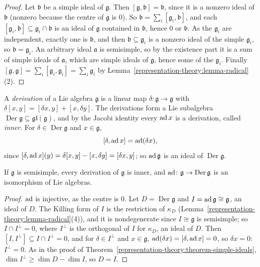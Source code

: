 \begin{proof}
Let $\mathfrak{b}$ be a simple ideal of $\mathfrak{g}$. Then $[\mathfrak{g}, \mathfrak{b}] = \mathfrak{b}$, since it is a nonzero ideal of $\mathfrak{b}$ (nonzero because the
centre of $\mathfrak{g}$ is $0$). So $\mathfrak{b} = \sum_i[\mathfrak{g}_i, \mathfrak{b}]$, and each $[\mathfrak{g}_i, \mathfrak{b}] \subseteq \mathfrak{g}_i \cap \mathfrak{b}$ is
an ideal of $\mathfrak{g}$ contained in $\mathfrak{b}$, hence $0$ or $\mathfrak{b}$. As the $\mathfrak{g}_i$ are independent, exactly one is $\mathfrak{b}$, and then
$\mathfrak{b} \subseteq \mathfrak{g}_i$ is a nonzero ideal of the simple $\mathfrak{g}_i$, so $\mathfrak{b} = \mathfrak{g}_i$. An arbitrary ideal $\mathfrak{a}$ is semisimple, so
by the existence part it is a sum of simple ideals of $\mathfrak{a}$, which are simple ideals of $\mathfrak{g}$, hence some of the $\mathfrak{g}_i$. Finally
$[\mathfrak{g}, \mathfrak{g}] = \sum_i[\mathfrak{g}_i, \mathfrak{g}_i] = \sum_i\mathfrak{g}_i$ by Lemma~\ref{representation-theory:lemma-radical}(2).
\end{proof}

A \emph{derivation} of a Lie algebra $\mathfrak{g}$ is a linear map $\delta \colon \mathfrak{g} \to \mathfrak{g}$ with $\delta[x, y] = [\delta x, y] + [x, \delta y]$. The
derivations form a Lie subalgebra $\operatorname{Der}\mathfrak{g} \subseteq \mathfrak{gl}(\mathfrak{g})$, and by the Jacobi identity every $\operatorname{ad} x$ is a derivation, called
\emph{inner}. For $\delta \in \operatorname{Der}\mathfrak{g}$ and $x \in \mathfrak{g}$,
\[
[\delta, \operatorname{ad} x] = \operatorname{ad}(\delta x),
\]
since $[\delta, \operatorname{ad} x](y) = \delta[x, y] - [x, \delta y] = [\delta x, y]$; so $\operatorname{ad}\mathfrak{g}$ is an ideal of $\operatorname{Der}\mathfrak{g}$.

\begin{theorem}\label{representation-theory:theorem-derivations}
If $\mathfrak{g}$ is semisimple, every derivation of $\mathfrak{g}$ is inner, and $\operatorname{ad} \colon \mathfrak{g} \to \operatorname{Der}\mathfrak{g}$ is an isomorphism of Lie algebras.
\end{theorem}

\begin{proof}
$\operatorname{ad}$ is injective, as the centre is $0$. Let $D = \operatorname{Der}\mathfrak{g}$ and $I = \operatorname{ad}\mathfrak{g} \cong \mathfrak{g}$, an ideal of $D$. The Killing form of $I$ is the
restriction of $\kappa_D$ (Lemma~\ref{representation-theory:lemma-radical}(4)), and it is nondegenerate since $I \cong \mathfrak{g}$ is semisimple; so
$I \cap I^\perp = 0$, where $I^\perp$ is the orthogonal of $I$ for $\kappa_D$, an ideal of $D$. Then $[I, I^\perp] \subseteq I \cap I^\perp = 0$, and for $\delta \in I^\perp$
and $x \in \mathfrak{g}$, $\operatorname{ad}(\delta x) = [\delta, \operatorname{ad} x] = 0$, so $\delta x = 0$: $I^\perp = 0$. As in the proof of
Theorem~\ref{representation-theory:theorem-simple-ideals}, $\dim I^\perp \geq \dim D - \dim I$, so $D = I$.
\end{proof}

